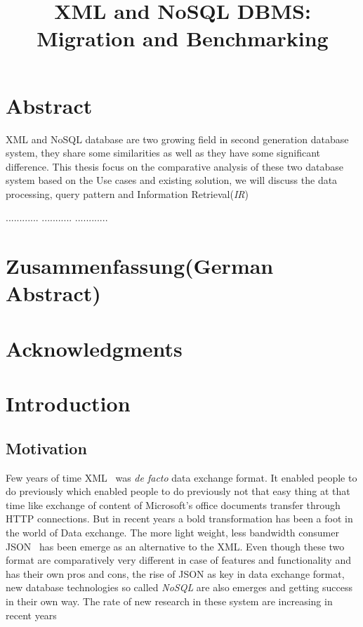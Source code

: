 \documentclass[a4paper,12pt]{article}
\title{XML and NoSQL DBMS: Migration and Benchmarking}
\subtitle{
}
\begin{document}
	
	\renewcommand{\lstlistingname}{Code} 
	
	
	\maketitle
	\thispagestyle{empty}
	
	\newpage
	\section*{Abstract}
		XML and NoSQL database are two growing field in second generation database system, they share some similarities as well as they have some significant difference. 
		This thesis focus on the  comparative analysis of these two database system based on the Use cases and existing solution, we will discuss the data processing, query pattern and  Information Retrieval(\textit{IR})
		
		............
		...........
		............
	
	\section*{Zusammenfassung(German Abstract)}
	
	\section*{Acknowledgments}
	
	\thispagestyle{empty}
	\newpage
	\tableofcontents
	\thispagestyle{empty}
	\newpage
	\section{Introduction}
	\setcounter{page}{1}
	\subsection{Motivation}
		\label{motivation}
			Few years of time XML~\cite{www/xml} was  \textit{de facto} data exchange format. It enabled people to do previously  which enabled people to do previously not that easy thing  at that time like exchange of content of Microsoft's office documents transfer through HTTP connections. But in recent years a bold transformation has been a foot in the world of Data exchange. The more light weight, less bandwidth consumer JSON~\cite{www/json} has been emerge as an alternative to the XML. Even though these two format are comparatively very different in case of features and functionality  and has their own pros and cons, the rise of JSON as key in data exchange format, new database technologies so called \textit{NoSQL}  are also emerges and getting success in their own way. The rate of new research in these system are increasing in recent years
			
\end{document}
